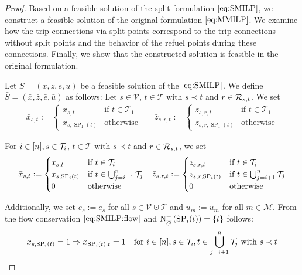 \begin{proof}

Based on a feasible solution of the split formulation $\eqref{eq:SMILP}$, we construct a feasible solution of the original formulation $\eqref{eq:MMILP}$. We examine how the trip connections via split points correspond to the trip connections without split points and the behavior of the refuel points during these connections. Finally, we show that the constructed solution is feasible in the original formulation.

Let ${S=(x,z,e,u)}$ be a feasible solution of the $\eqref{eq:SMILP}$. We define ${\bar{S}=\left(\bar{x},\bar{z},\bar{e},\bar{u}\right)}$ as follows: Let ${s\in\mathcal{V}}$, ${t\in\mathcal{T}}$ with ${s\prec t}$ and ${r\in\mathcal{R}_{s,t}}$. We set
\begin{align*}
	\bar{x}_{s,t} := \begin{cases} x_{s,t} & \text{if } t\in\mathcal{T}_1 \\ x_{s,\operatorname{SP}_1(t)} & \text{otherwise} \end{cases} &&
	\bar{z}_{s,r,t} := \begin{cases} z_{s,r,t} & \text{if } t\in\mathcal{T}_1 \\ z_{s,r,\operatorname{SP}_1(t)} & \text{otherwise} \end{cases}
\end{align*}

For ${i\in[n]}, {s\in\mathcal{T}_i}$, ${t\in\mathcal{T}}$ with ${s\prec t}$ and ${r\in\mathcal{R}_{s,t}}$, we set
\begin{align*}
	\bar{x}_{s,t} := \begin{cases} x_{s,t} & \text{if } t\in\mathcal{T}_i \\ x_{s,\operatorname{SP}_i(t)} & \text{if } t\in\bigcup_{j=i+1}^n \mathcal{T}_j \\ 0 & \text{otherwise} \end{cases} &&
	\bar{z}_{s,r,t} := \begin{cases} z_{s,r,t} & \text{if } t\in\mathcal{T}_i \\ z_{s,r,\operatorname{SP}_i(t)} & \text{if } t\in\bigcup_{j=i+1}^n \mathcal{T}_j \\ 0 & \text{otherwise} \end{cases}
\end{align*}

Additionally, we set ${\bar{e}_s := e_s}$ for all ${s\in\mathcal{V}\cupdot\mathcal{T}}$ and ${\bar{u}_m := u_m}$ for all ${m\in\mathcal{M}}$. From the flow conservation $\eqref{eq:SMILP:flow}$ and ${\operatorname{N}_{\overline{G}}^+\left(\operatorname{SP}_i(t)\right)=\{t\}}$ follows:
\begin{align*}
	x_{s,\operatorname{SP}_i(t)}=1 \Rightarrow x_{\operatorname{SP}_i(t),t}=1 && \text{for } i\in[n], s\in\mathcal{T}_i, t\in\bigcup_{j=i+1}^n \mathcal{T}_j \text{ with } s\prec t
\end{align*}


\end{proof}
